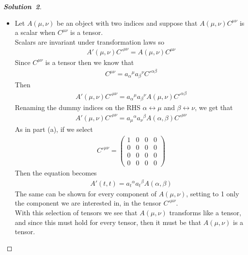 \documentclass[11pt]{article}
\theoremstyle{definition}
\renewcommand*{\proofname}{\bf{Solution}}
\begin{document}
\begin{proof}[\proofname\ 2]
\begin{itemize}
\item [(b)] Let $A(\mu,\nu)$ be an object with two indices and suppose that
$A(\mu, \nu)C^{\mu\nu}$ is a scalar when $C^{\mu\nu}$ is a tensor. \\
Scalars are invariant under transformation laws so
\begin{align*}
    A'(\mu, \nu)C'^{\mu\nu} = A(\mu, \nu)C^{\mu\nu}
\end{align*}
Since $C^{\mu\nu}$ is a tensor then we know that
\begin{align*}
    C^{\mu\nu} = {a_\alpha}^\mu{a_\beta}^\nu C'^{\alpha\beta}
\end{align*}
Then
\begin{align*}
    A'(\mu, \nu)C'^{\mu\nu} = {a_\alpha}^\mu{a_\beta}^\nu A(\mu, \nu) C'^{\alpha\beta}
\end{align*}
Renaming the dummy indices on the RHS $\alpha \leftrightarrow \mu$ 
and $\beta \leftrightarrow \nu$, we get that
\begin{align*}
    A'(\mu, \nu)C'^{\mu\nu} = {a_\mu}^\alpha{a_\nu}^\beta A(\alpha, \beta) C'^{\mu\nu}
\end{align*}
As in part (a), if we select
\begin{align*}
    C'^{\mu\nu} = \begin{pmatrix}
        1 & 0 & 0 & 0 \\
        0 & 0 & 0 & 0 \\
        0 & 0 & 0 & 0 \\
        0 & 0 & 0 & 0
    \end{pmatrix}
\end{align*}
Then the equation becomes
\begin{align*}
    A'(t, t) = {a_t}^\alpha{a_t}^\beta A(\alpha, \beta)
\end{align*}
The same can be shown for every component of $A(\mu,\nu)$, setting to 1 only
the component we are interested in, in the tensor $C'^{\mu\nu}$. \\
With this selection of tensors we see that $A(\mu, \nu)$ transforms like a
tensor, and since this must hold for every tensor, then it must be that
$A(\mu, \nu)$ is a tensor.
\end{itemize}
\end{proof}
\end{document}
